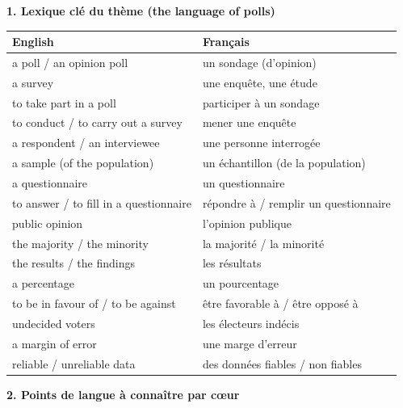 \documentclass[11pt]{article}
\begin{document}
\begin{bilan}

\textbf{1. Lexique clé du thème (the language of polls)}

\begin{center}
\begin{tabularx}{\linewidth}{|X|X|}\hline
\rowcolor{popblueL} \textbf{English} & \textbf{Français} \\ \hline
a poll / an opinion poll & un sondage (d'opinion) \\ \hline
a survey & une enquête, une étude \\ \hline
to take part in a poll & participer à un sondage \\ \hline
to conduct / to carry out a survey & mener une enquête \\ \hline
a respondent / an interviewee & une personne interrogée \\ \hline
a sample (of the population) & un échantillon (de la population) \\ \hline
a questionnaire & un questionnaire \\ \hline
to answer / to fill in a questionnaire & répondre à / remplir un questionnaire \\ \hline
public opinion & l'opinion publique \\ \hline
the majority / the minority & la majorité / la minorité \\ \hline
the results / the findings & les résultats \\ \hline
a percentage & un pourcentage \\ \hline
to be in favour of / to be against & être favorable à / être opposé à \\ \hline
undecided voters & les électeurs indécis \\ \hline
a margin of error & une marge d'erreur \\ \hline
reliable / unreliable data & des données fiables / non fiables \\ \hline
\end{tabularx}
\end{center}

\textbf{2. Points de langue à connaître par cœur}


\end{bilan}
\end{document}
